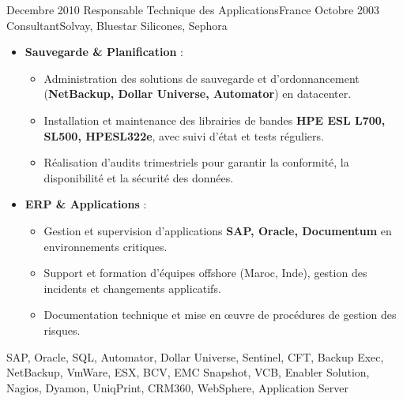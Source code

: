 \begin{experiences}
\consultantexperience
    {Decembre 2010} {Responsable Technique des Applications}{}{France}
    {Octobre 2003}    {Consultant}{Solvay, Bluestar Silicones, Sephora} {
        \begin{itemize}[left=0pt,label={},itemsep=0.5em]
          \vspace{0.3em}
          \item \textbf{Sauvegarde \& Planification} :
            \begin{itemize}[itemsep=0.2em,topsep=0.2em,parsep=0pt]
              \small
              \item Administration des solutions de sauvegarde et d’ordonnancement (\textbf{NetBackup, Dollar Universe, Automator}) en datacenter.
              \item Installation et maintenance des librairies de bandes \textbf{HPE ESL L700, SL500, HPESL322e}, avec suivi d’état et tests réguliers.
              \item Réalisation d’audits trimestriels pour garantir la conformité, la disponibilité et la sécurité des données.
            \end{itemize}
          \vspace{0.3em}

              \item \textbf{ERP \& Applications} :
                \begin{itemize}[itemsep=0.2em,topsep=0.2em,parsep=0pt]
                  \small
                  \item Gestion et supervision d’applications \textbf{SAP, Oracle, Documentum} en environnements critiques.
                  \item Support et formation d’équipes offshore (Maroc, Inde), gestion des incidents et changements applicatifs.
                  \item Documentation technique et mise en œuvre de procédures de gestion des risques.
                \end{itemize}
          \vspace{0.3em}

        \end{itemize} %
    }
    {SAP, Oracle, SQL, Automator, Dollar Universe, Sentinel, CFT, Backup Exec, NetBackup, VmWare, ESX, BCV, EMC Snapshot, VCB, Enabler Solution, Nagios, Dyamon, UniqPrint, CRM360, WebSphere, Application Server}

\emptySeparator
\end{experiences}
